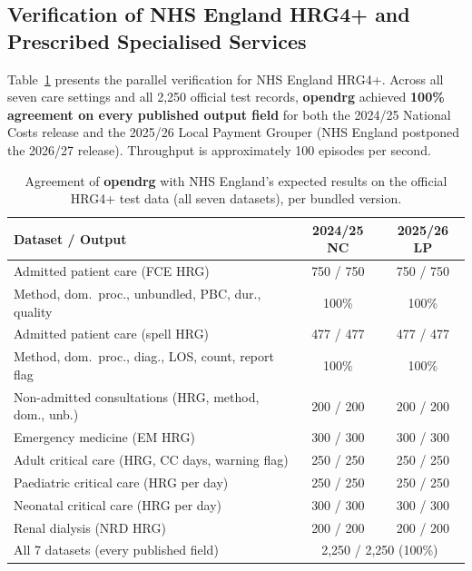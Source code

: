 \documentclass[fleqn,10pt]{IOMEDArticle}
\begin{document}
\subsection{Verification of NHS England HRG4+ and Prescribed Specialised Services}

Table~\ref{tab:hrgresults} presents the parallel verification for NHS England HRG4+. Across all seven care settings and all 2{,}250 official test records, \textbf{opendrg} achieved \textbf{100\% agreement on every published output field} for both the 2024/25 National Costs release and the 2025/26 Local Payment Grouper (NHS England postponed the 2026/27 release). Throughput is approximately 100 episodes per second.

\begin{table}[!t]\centering
\caption{Agreement of \textbf{opendrg} with NHS England's expected results on the official HRG4+ test data (all seven datasets), per bundled version.}
\label{tab:hrgresults}
\scriptsize
\setlength{\tabcolsep}{3.0pt}
\begin{tabular}{@{}lcc@{}}
\toprule
Dataset / Output & 2024/25 NC & 2025/26 LP \\
\midrule
Admitted patient care (FCE HRG) & 750 / 750 & 750 / 750 \\
\quad Method, dom.\ proc., unbundled, PBC, dur., quality & 100\% & 100\% \\
Admitted patient care (spell HRG) & 477 / 477 & 477 / 477 \\
\quad Method, dom.\ proc., diag., LOS, count, report flag & 100\% & 100\% \\
\midrule
Non-admitted consultations (HRG, method, dom., unb.) & 200 / 200 & 200 / 200 \\
Emergency medicine (EM HRG) & 300 / 300 & 300 / 300 \\
Adult critical care (HRG, CC days, warning flag) & 250 / 250 & 250 / 250 \\
Paediatric critical care (HRG per day) & 250 / 250 & 250 / 250 \\
Neonatal critical care (HRG per day) & 300 / 300 & 300 / 300 \\
Renal dialysis (NRD HRG) & 200 / 200 & 200 / 200 \\
\midrule
All 7 datasets (every published field) & \multicolumn{2}{c}{2{,}250 / 2{,}250 (100\%)} \\
\bottomrule
\end{tabular}
\end{table}
\end{document}
